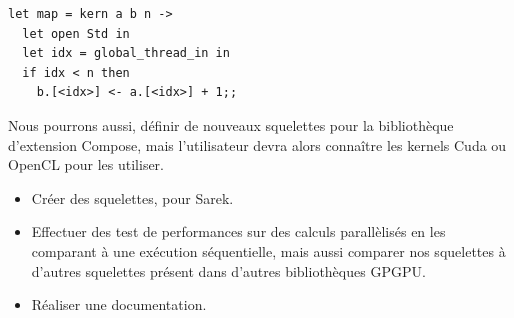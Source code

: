 \documentclass{report}
\begin{document}
\begin{lstlisting}
let map = kern a b n ->
  let open Std in
  let idx = global_thread_in in
  if idx < n then
    b.[<idx>] <- a.[<idx>] + 1;;
\end{lstlisting}

Nous pourrons aussi, définir de nouveaux squelettes pour la bibliothèque d’extension Compose, mais l’utilisateur devra alors connaître les kernels Cuda ou OpenCL pour les utiliser. 

\begin{itemize}
\item Créer des squelettes, pour Sarek.
\item Effectuer des test de performances sur des calculs parallèlisés en les comparant à une exécution séquentielle, mais aussi comparer nos squelettes à d’autres squelettes présent dans d’autres bibliothèques GPGPU.
\item Réaliser une documentation.
\end{itemize}

%
%
\end{document}
